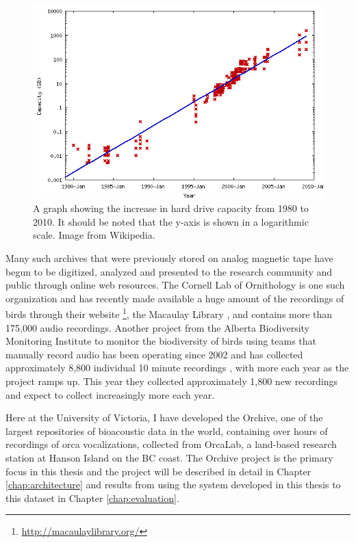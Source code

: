 \documentclass[12pt,oneside]{book}
\begin{document}
\begin{figure}[t]
\centering
\includegraphics[width=\columnwidth]{figures/hardDriveCapacityOverTime.png}
\caption{A graph showing the increase in hard drive capacity from 1980
  to 2010.  It should be noted that the y-axis is shown in a
  logarithmic scale.  Image from Wikipedia.}
\label{fig:hardDriveCapacityOverTime}
\end{figure}

Many such archives that were previously stored on analog magnetic tape
have begun to be digitized, analyzed and presented to the research
community and public through online web resources.  The Cornell Lab of
Ornithology is one such organization and has recently made available a
huge amount of the recordings of birds through their
website \footnote{\url{http://macaulaylibrary.org/}}, the Macaulay
Library \cite{macaulay2007library}, and contains more than 175,000
audio recordings.  Another project from the Alberta Biodiversity
Monitoring Institute to monitor the biodiversity of birds using teams
that manually record audio has been operating since 2002 and has
collected approximately 8,800 individual 10 minute recordings
\cite{boutin2009abmi}, with more each year as the project ramps up.
This year they collected approximately 1,800 new recordings and expect
to collect increasingly more each year.

Here at the University of Victoria, I have developed the Orchive, one
of the largest repositories of bioacoustic data in the world,
containing over \aboutNumberOfOrchiveRecordings hours of recordings of
orca vocalizations, collected from OrcaLab, a land-based research
station at Hanson Island on the BC coast.  The Orchive project is the
primary focus in this thesis and the project will be described in
detail in Chapter \ref{chap:architecture} and results from using the
system developed in this thesis to this dataset in Chapter
\ref{chap:evaluation}.
\end{document}
